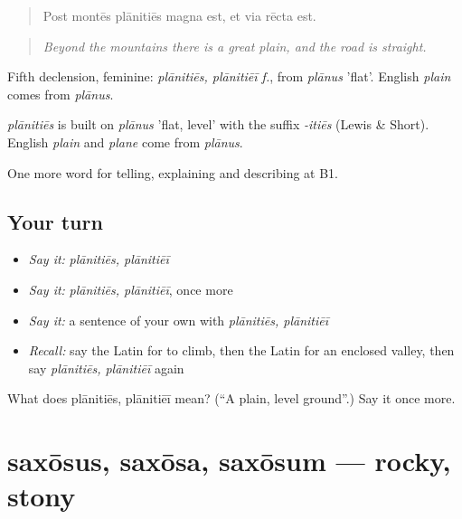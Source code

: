 \begin{quote}
Post montēs plānitiēs magna est, et via rēcta est.
\end{quote}

\begin{quote}
\emph{Beyond the mountains there is a great plain, and the road is straight.}
\end{quote}

Fifth declension, feminine: \emph{plānitiēs, plānitiēī f.}, from \emph{plānus} 'flat'. English \emph{plain} comes from \emph{plānus}.

\begin{cousinweb}
\emph{plānitiēs} is built on \emph{plānus} 'flat, level' with the suffix \emph{-itiēs} (Lewis \& Short). English \emph{plain} and \emph{plane} come from \emph{plānus}.
\end{cousinweb}

\begin{grammarlens}[title={What you've built}]
One more word for telling, explaining and describing at B1.
\end{grammarlens}

\subsection*{Your turn}
\begin{itemize}
\raggedright
  \item \emph{Say it:} \emph{plānitiēs, plānitiēī}
  \item \emph{Say it:} \emph{plānitiēs, plānitiēī}, once more
  \item \emph{Say it:} a sentence of your own with \emph{plānitiēs, plānitiēī}
  \item \emph{Recall:} say the Latin for to climb, then the Latin for an enclosed valley, then say \emph{plānitiēs, plānitiēī} again
\end{itemize}

\begin{tcolorbox}[breakable,colback=teal!4,colframe=teal!35!black,title={Before you move on}]
What does plānitiēs, plānitiēī mean? (\textquotedblleft{}A plain, level ground\textquotedblright{}.) Say it once more.
\end{tcolorbox}
\section[saxōsus, saxōsa, saxōsum]{saxōsus, saxōsa, saxōsum — rocky, stony}

\label{lesson:LA-C481-saxosus}



